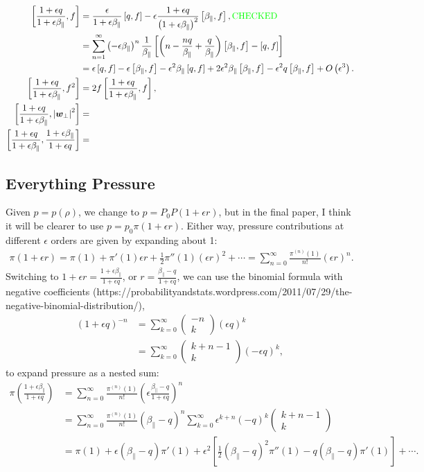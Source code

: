 \documentclass{article}
\newcommand{\para}{\parallel}
\newcommand{\ep}{\epsilon}
\newcommand{\fr}{\frac{1+\ep q}{1+\ep\beta_\para}}
\newcommand{\frinv}{\frac{1+\ep\beta_\para}{1+\ep q}}
\newcommand{\pth} [1] {\left( #1 \right) }
\newcommand{\br} [1] {\left[ #1 \right] }
\newcommand{\pmat} [1] {\begin{pmatrix} #1 \end{pmatrix}}
\begin{document}
\begin{align} 
    \br{\fr, f} &= \frac{\ep}{1+\ep\beta_\para}\br{q,f} - \ep\frac{1+\ep q}{\pth{1+\ep\beta_\para}^2} \br{\beta_\para,f}, \text{\color{green} CHECKED} \\ 
        &= \sum^\infty_{n=1} \pth{-\ep\beta_\para}^n \frac{1}{\beta_\para} \br{\pth{n - \frac{nq}{\beta_\para} + \frac{q}{\beta_\para}} \br{\beta_\para,f} - \br{q,f} } \\ 
        &= \ep\br{q,f} - \ep\br{\beta_\para,f} - \ep^2\beta_\para\br{q,f} + 2\ep^2\beta_\para\br{\beta_\para,f} - \ep^2q\br{\beta_\para,f} + O\pth{\ep^3}. \\ 
    \br{\fr,f^2} &= 2f\br{\fr,f}, \\ 
    \br{\fr,\left| \bm{w}_\perp \right|^2} &= \\ 
    \br{\fr, \frinv} &= 
\end{align}


\subsection{Everything Pressure}
Given $p=p(\rho)$, we change to $p=P_0P(1+\ep r)$, but in the final paper, I think it will be clearer to use $p=p_0\pi(1+\ep r)$. Either way, pressure contributions at different $\ep$ orders are given by expanding about 1: 
\begin{align*}
    \pi(1+\ep r) = \pi(1) + \pi'(1) \ep r + \frac{1}{2} \pi''(1) (\ep r)^2 + \cdots = \sum_{n=0}^\infty \frac{\pi^{(n)}(1)}{n!} (\ep r)^n. 
\end{align*}
Switching to $1+\ep r = \frinv$, or $r = \frac{\beta_\para-q}{1+\ep q}$, we can use the binomial formula with negative coefficients (https://probabilityandstats.wordpress.com/2011/07/29/the-negative-binomial-distribution/), 
\begin{align*}
    \pth{1+\ep q}^{-n} &= \sum_{k=0}^\infty \pmat{-n\\k} \pth{\ep q}^k \\ 
    &= \sum_{k=0}^\infty \pmat{k+n-1 \\ k} \pth{-\ep q}^k, 
\end{align*}
to expand pressure as a nested sum:
\begin{align*}
    \pi\pth{\frinv} &= \sum_{n=0}^\infty \frac{\pi^{(n)}(1)}{n!} \pth{\ep\frac{\beta_\para-q}{1+\ep q}}^n \\ 
    &= \sum_{n=0}^\infty \frac{\pi^{(n)}(1)}{n!} \pth{\beta_\para-q}^n \sum_{k=0}^\infty \ep^{k+n} \pth{-q}^k \pmat{k+n-1 \\ k} \\ 
        &= \pi(1) + \ep \pth{\beta_\para-q} \pi'(1) + \ep^2 \br{\frac{1}{2}\pth{\beta_\para-q}^2 \pi''(1) - q\pth{\beta_\para-q} \pi'(1)} + \cdots.
\end{align*}
\end{document}
